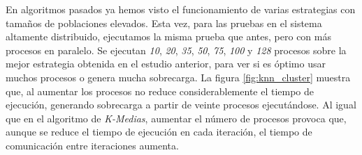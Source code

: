 			\newpage
		
		
			En algoritmos pasados ya hemos visto el funcionamiento de varias estrategias con tamaños de poblaciones elevados. Esta vez, para las pruebas en el sistema altamente distribuido, ejecutamos la misma prueba que antes, pero con más procesos en paralelo. Se ejecutan \textit{10}, \textit{20}, \textit{35}, \textit{50}, \textit{75}, \textit{100} y \textit{128} procesos sobre la mejor estrategia obtenida en el estudio anterior, para ver si es óptimo usar muchos procesos o genera mucha sobrecarga. La figura \ref{fig:knn_cluster} muestra que, al aumentar los procesos no reduce considerablemente el tiempo de ejecución, generando sobrecarga a partir de veinte procesos ejecutándose. Al igual que en el algoritmo de \textit{K-Medias}, aumentar el número de procesos provoca que, aunque se reduce el tiempo de ejecución en cada iteración, el tiempo de comunicación entre iteraciones aumenta. 
			

			
			
